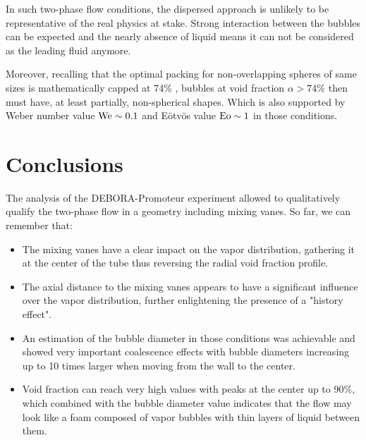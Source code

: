 \begin{remark*}{}
In such two-phase flow conditions, the dispersed approach is unlikely to be representative of the real physics at stake. Strong interaction between the bubbles can be expected and the nearly absence of liquid means it can not be considered as the leading fluid anymore.

\npar

Moreover, recalling that the optimal packing for non-overlapping spheres of same sizes is mathematically capped at 74\% \cite{wu_fan_2003}, bubbles at void fraction $\alpha > 74\%$ then must have, at least partially, non-spherical shapes. Which is also supported by Weber number value $\mathrm{We} \sim 0.1$ and E\"otv\"os value $\mathrm{Eo} \sim 1$ in those conditions.
\end{remark*}



\section{Conclusions}

The analysis of the DEBORA-Promoteur experiment allowed to qualitatively qualify the two-phase flow in a geometry including mixing vanes. So far, we can remember that:

\begin{itemize}
\item The mixing vanes have a clear impact on the vapor distribution, gathering it at the center of the tube thus reversing the radial void fraction profile.

\item The axial distance to the mixing vanes appears to have a significant influence over the vapor distribution, further enlightening the presence of a "history effect". 

\item An estimation of the bubble diameter in those conditions was achievable and showed very important coalescence effects with bubble diameters increasing up to 10 times larger when moving from the wall to the center.

\item Void fraction can reach very high values with peaks at the center up to $90\%$, which combined with the bubble diameter value indicates that the flow may look like a foam composed of vapor bubbles with thin layers of liquid between them.
\end{itemize}


